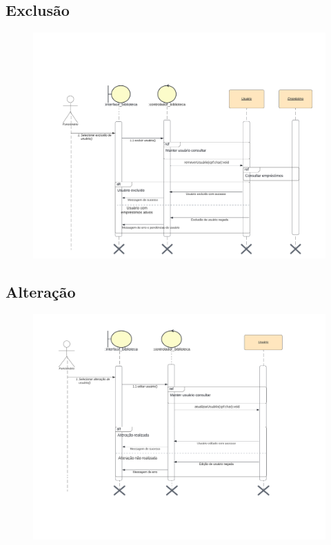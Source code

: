 \newpage

\subsection{Exclusão}

\begin{figure}[h]
    \centering
    \includegraphics[width=1.0\linewidth]{Imagens/ExcluirUsuario-sequencia.pdf}
\end{figure}

\newpage

\subsection{Alteração}

\begin{figure}[h]
    \centering
    \includegraphics[width=1.0\linewidth]{Imagens/AlterarUsuario-sequencia.pdf}
\end{figure}

